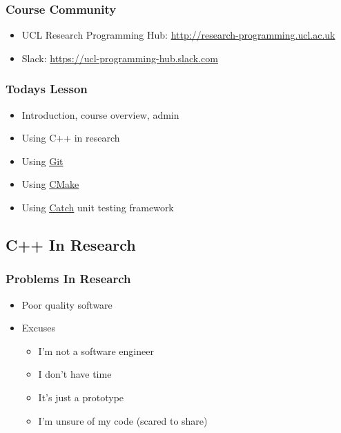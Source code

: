 \subsubsection{Course Community}\label{course-community}

\begin{itemize}
\itemsep1pt\parskip0pt
\item
  UCL Research Programming Hub:
  \href{http://research-programming.ucl.ac.uk/}{http://research-programming.ucl.ac.uk}
\item
  Slack:
  \href{https://ucl-programming-hub.slack.com/}{https://ucl-programming-hub.slack.com}
\end{itemize}

\subsubsection{Todays Lesson}\label{todays-lesson}

\begin{itemize}
\itemsep1pt\parskip0pt
\item
  Introduction, course overview, admin
\item
  Using C++ in research
\item
  Using \href{http://www.git-scm.org}{Git}
\item
  Using \href{http://www.cmake.org}{CMake}
\item
  Using \href{https://github.com/philsquared/Catch}{Catch} unit testing
  framework
\end{itemize}

\subsection{C++ In Research}\label{c-in-research}

\subsubsection{Problems In Research}\label{problems-in-research}

\begin{itemize}
\itemsep1pt\parskip0pt
\item
  Poor quality software
\item
  Excuses

  \begin{itemize}
  \itemsep1pt\parskip0pt
  \item
    I'm not a software engineer
  \item
    I don't have time
  \item
    It's just a prototype
  \item
    I'm unsure of my code (scared to share)
  \end{itemize}
\end{itemize}

